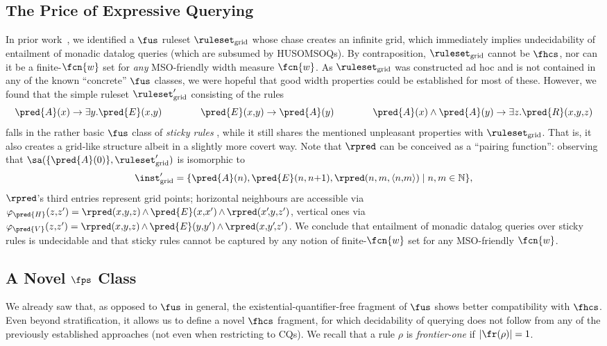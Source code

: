 \subsection{The Price of Expressive Querying}\label{sec:prize}
%
In prior work~\cite{ICDT2023}, we identified a $\fus$ ruleset $\ruleset_\mathrm{grid}$  whose chase creates an infinite grid, which immediately implies undecidability of entailment of monadic datalog queries (which
are subsumed by HUSOMSOQs). By contraposition, $\ruleset_\mathrm{grid}$ cannot be $\fhcs$, nor can it be a finite-$\fcn{w}$ set for \emph{any} MSO-friendly width measure $\fcn{w}$.
As $\ruleset_\mathrm{grid}$ was constructed ad hoc and is not contained in any of the known ``concrete'' $\fus$ classes, we were hopeful that good width properties could be established for most of these.
However, we found that the simple ruleset $\ruleset'_{\smash{\mathrm{grid}}}$ consisting of the rules
$$
\pred{A}(x) \to \exists y. \pred{E}(x,\!y)
\qquad\qquad
\pred{E}(x,\!y) \to \pred{A}(y)
\qquad\qquad
\pred{A}(x) \wedge \pred{A}(y) \to \exists z. \pred{R}(x,\!y,\!z)
$$%
falls in the rather basic $\fus$ class of \emph{sticky rules} \cite{CaliGP12}, while it still shares the mentioned unpleasant properties with $\ruleset_\mathrm{grid}$. That is, it also creates a grid-like structure albeit in a slightly more covert way. Note that $\rpred$ can be conceived as a ``pairing function'': observing that  $\sa(\{\pred{A}(0)\},\ruleset'_{\smash{\mathrm{grid}}})$ is isomorphic to 
$$\inst'_\mathrm{grid} = \{ \pred{A}(n), \pred{E}(n, n{+}1), \rpred(n,m,\langle n,\!m \rangle) \mid n,m \in \mathbb{N} \},$$%
$\rpred$'s third entries represent grid points; horizontal neighbours are accessible via
{$\varphi_\pred{H}(z,\!z')=\rpred(x,\!y,\!z) {\,\wedge\,} \pred{E}(x,\!x') {\,\wedge\,} \rpred(x'\!,\!y,\!z')$}, vertical ones via
$\varphi_\pred{V}(z,\!z')=\rpred(x,\!y,\!z) {\,\wedge\,} \pred{E}(y,\!y') {\,\wedge\,} \rpred(x,\!y'\!,\!z')$. We conclude that entailment of monadic datalog queries over sticky rules is undecidable and that sticky rules cannot be captured by any notion of finite-$\fcn{w}$ set for any MSO-friendly $\fcn{w}$.   

\subsection{A Novel $\fps$ Class}
%
%
We already saw that, as opposed to $\fus$ in general, the existential-quantifier-free fragment of $\fus$ shows better compatibility with $\fhcs$. Even beyond stratification, it allows us to define a novel $\fhcs$ fragment, for which decidability of querying does not follow from any of the previously established approaches (not even when restricting to CQs). We recall that a rule $\rho$ is \emph{frontier-one} if $|\fr(\rho)|=1$. 

